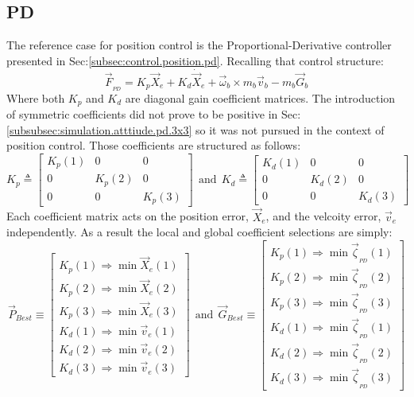 \subsection{PD}
\label{subsec:simulation.position.pd}
The reference case for position control is the Proportional-Derivative controller presented in Sec:\ref{subsec:control.position.pd}. Recalling that control structure:
\begin{equation}
\vec{F}_{_{PD}}=K_p\vec{X}_e + K_d\dot{\vec{X}}_e + \vec{\omega}_b\times m_b\vec{v}_b-m_b\vec{G}_b
\end{equation}
Where both $K_p$ and $K_d$ are diagonal gain coefficient matrices. The introduction of symmetric coefficients did not prove to be positive in Sec:\ref{subsubsec:simulation.atttiude.pd.3x3} so it was not pursued in the context of position control. Those coefficients are structured as follows:
\begin{equation}\label{eq:simulation-attitde-pd-diagonal-coefficients}
K_p\triangleq \begin{bmatrix}
K_p(1) & 0 & 0\\
0 & K_p(2) & 0\\
0 & 0 & K_p(3)
\end{bmatrix}
~~\text{and}~~K_d\triangleq \begin{bmatrix}
K_d(1) & 0 & 0\\
0 & K_d(2) & 0\\
0 & 0 & K_d(3)
\end{bmatrix}
\end{equation}
Each coefficient matrix acts on the position error, $\vec{X}_e$, and the velcoity error, $\vec{v}_e$ independently. As a result the local and global coefficient selections are simply:
\begin{equation}
\vec{P}_{Best}\equiv
\begin{bmatrix}
K_p(1)\Rightarrow \min \vec{X}_e(1)\\
K_p(2)\Rightarrow \min \vec{X}_e(2)\\
K_p(3)\Rightarrow \min \vec{X}_e(3)\\
K_d(1)\Rightarrow \min \vec{v}_e(1)\\
K_d(2)\Rightarrow \min \vec{v}_e(2)\\
K_d(3)\Rightarrow \min \vec{v}_e(3)
\end{bmatrix}~~\text{and}~~\vec{G}_{Best}\equiv\begin{bmatrix}
K_p(1)\Rightarrow \min \vec{\zeta}_{_{PD}}(1)\\
K_p(2)\Rightarrow \min \vec{\zeta}_{_{PD}}(2)\\
K_p(3)\Rightarrow \min \vec{\zeta}_{_{PD}}(3)\\
K_d(1)\Rightarrow \min \vec{\zeta}_{_{PD}}(1)\\
K_d(2)\Rightarrow \min \vec{\zeta}_{_{PD}}(2)\\
K_d(3)\Rightarrow \min \vec{\zeta}_{_{PD}}(3)
\end{bmatrix}
\end{equation}
